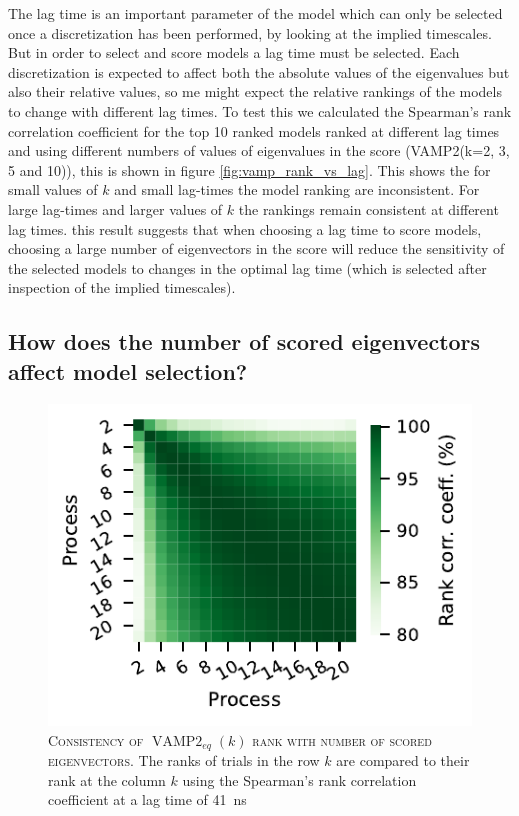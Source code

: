 \documentclass[journal=jacsat,manuscript=article]{achemso}
\begin{document}
The lag time is an important parameter of the model which can only be selected once a discretization has been performed, by looking at the implied timescales.  But in order to select and score models a lag time must be selected. Each discretization is expected to affect both the absolute values of the eigenvalues but also their relative values, so me might expect the relative rankings of the models to change with different lag times. To test this we calculated the Spearman's rank correlation coefficient for the top 10 ranked models ranked at different lag times and using different numbers of values of eigenvalues in the score (VAMP2(k=2, 3, 5 and 10)), this is shown in figure \ref{fig:vamp_rank_vs_lag}.  This shows the for small values of $k$ and small lag-times the model ranking are inconsistent. For large lag-times and larger values of $k$ the rankings remain consistent at different lag times. this result suggests that when choosing a lag time to score models, choosing a large number of eigenvectors in the score will reduce the sensitivity of the selected models to changes in the optimal lag time (which is selected after inspection of the implied timescales). 


\subsection{How does the number of scored eigenvectors affect model selection?}

\begin{figure}
    \centering
    \includegraphics{figures/vampeq_rank_vs_proc.pdf}
    \caption{\textsc{Consistency of $\operatorname{VAMP2}_{eq}(k)$ rank with number of scored eigenvectors}. The ranks of trials in the row $k$ are compared to their rank at the column $k$ using the Spearman's rank correlation coefficient at a lag time of \SI{41}{\nano\second}}
    \label{fig:vampeq_rank_vs_n_procs}
\end{figure}
\end{document}
